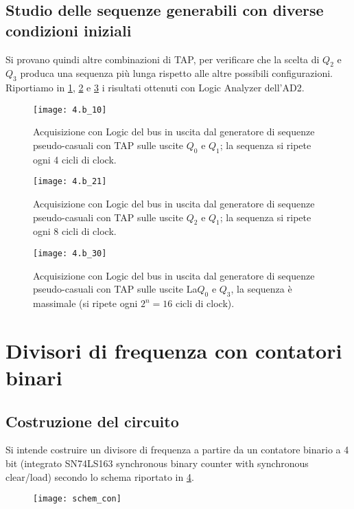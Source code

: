 \documentclass[10pt, a4paper, italian]{article}
\begin{document}
\subsection{Studio delle sequenze generabili con diverse condizioni iniziali}
Si provano quindi altre combinazioni di TAP, per verificare che la scelta di
$Q_2$ e $Q_3$ produca una sequenza più lunga rispetto alle altre possibili
configurazioni. Riportiamo in \cref{fig: TAP_10}, \cref{fig: TAP_21} e
\cref{fig: TAP_30} i risultati ottenuti con Logic Analyzer dell'AD2.
\begin{figure}[htbp]
\centering
	\texttt{[image: 4.b\_10]}
	\caption{Acquisizione con Logic del bus in uscita dal generatore di sequenze
	pseudo-casuali con TAP sulle uscite $Q_0$ e $Q_1$; la sequenza si ripete ogni
	4 cicli di clock.
	\label{fig: TAP_10}}
\end{figure}
\begin{figure}[htbp]
\centering
	\texttt{[image: 4.b\_21]}
	\caption{Acquisizione con Logic del bus in uscita dal generatore di sequenze
	pseudo-casuali con TAP sulle uscite $Q_2$ e $Q_1$; la sequenza si ripete ogni
	8 cicli di clock.
	\label{fig: TAP_21}}
\end{figure}
\begin{figure}[htbp]
\centering
	\texttt{[image: 4.b\_30]}
	\caption{Acquisizione con Logic del bus in uscita dal generatore di sequenze
	pseudo-casuali con TAP sulle uscite La$Q_0$ e $Q_3$, la sequenza è massimale
	(si ripete ogni $2^n = 16$ cicli di clock).
	\label{fig: TAP_30}}
\end{figure}

\section{Divisori di frequenza con contatori binari}
\subsection{Costruzione del circuito}
Si intende costruire un divisore di frequenza a partire da un contatore
binario a 4 bit (integrato SN74LS163 synchronous binary counter with
synchronous clear/load) secondo lo schema riportato in
\cref{fig: schem_counter}. 
\begin{figure}[htbp]
\centering
	\texttt{[image: schem\_con]}
	\caption{\label{fig: schem_counter}}
\end{figure}
\end{document}
